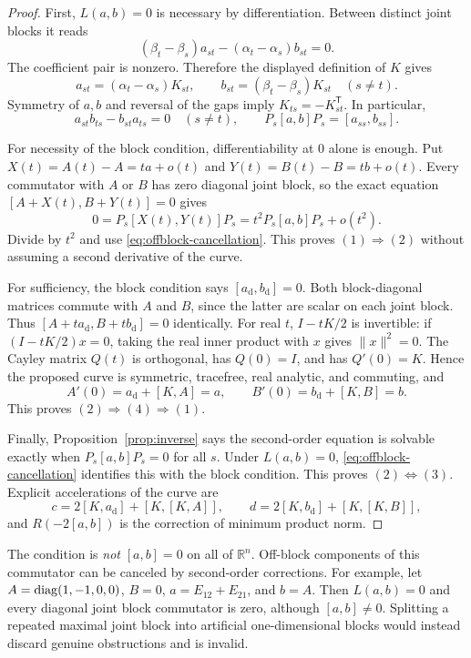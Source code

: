 \begin{proof}
First, $L(a,b)=0$ is necessary by differentiation.  Between distinct joint
blocks it reads
\[
 (\beta_t-\beta_s)a_{st}-(\alpha_t-\alpha_s)b_{st}=0.
\]
The coefficient pair is nonzero.  Therefore the displayed definition of
$K$ gives
\[
 a_{st}=(\alpha_t-\alpha_s)K_{st},\qquad
 b_{st}=(\beta_t-\beta_s)K_{st}\quad(s\ne t).
\]
Symmetry of $a,b$ and reversal of the gaps imply $K_{ts}=-K_{st}^{\mathsf T}$.
In particular,
\begin{equation}\label{eq:offblock-cancellation}
 a_{st}b_{ts}-b_{st}a_{ts}=0\quad(s\ne t),\qquad
 P_s[a,b]P_s=[a_{ss},b_{ss}].
\end{equation}

For necessity of the block condition, differentiability at $0$ alone is
enough.  Put $X(t)=A(t)-A=ta+o(t)$ and $Y(t)=B(t)-B=tb+o(t)$.  Every
commutator with $A$ or $B$ has zero diagonal joint block, so the exact
equation $[A+X(t),B+Y(t)]=0$ gives
\[
 0=P_s[X(t),Y(t)]P_s=t^2P_s[a,b]P_s+o(t^2).
\]
Divide by $t^2$ and use \eqref{eq:offblock-cancellation}.  This proves
$(1)\Rightarrow(2)$ without assuming a second derivative of the curve.

For sufficiency, the block condition says $[a_{\mathrm d},b_{\mathrm d}]=0$.
Both block-diagonal matrices commute with $A$ and $B$, since the latter
are scalar on each joint block.  Thus
$[A+t a_{\mathrm d},B+t b_{\mathrm d}]=0$ identically.  For real $t$,
$I-tK/2$ is invertible: if $(I-tK/2)x=0$, taking the real inner product with
$x$ gives $\|x\|^2=0$.  The Cayley matrix $Q(t)$ is orthogonal, has
$Q(0)=I$, and has $Q'(0)=K$.  Hence the proposed curve is symmetric,
tracefree, real analytic, and commuting, and
\[
 A'(0)=a_{\mathrm d}+[K,A]=a,\qquad
 B'(0)=b_{\mathrm d}+[K,B]=b.
\]
This proves $(2)\Rightarrow(4)\Rightarrow(1)$.

Finally, Proposition~\ref{prop:inverse} says the second-order equation is
solvable exactly when $P_s[a,b]P_s=0$ for all $s$.  Under $L(a,b)=0$,
\eqref{eq:offblock-cancellation} identifies this with the block condition.
This proves $(2)\Leftrightarrow(3)$.  Explicit accelerations of the curve are
\[
 c=2[K,a_{\mathrm d}]+[K,[K,A]],\qquad
 d=2[K,b_{\mathrm d}]+[K,[K,B]],
\]
and $R(-2[a,b])$ is the correction of minimum product norm.
\end{proof}

\begin{remark}
The condition is \emph{not} $[a,b]=0$ on all of $\mathbb R^n$.  Off-block
components of this commutator can be canceled by second-order corrections.
For example, let $A=\operatorname{diag}(1,-1,0,0)$, $B=0$,
$a=E_{12}+E_{21}$, and $b=A$.  Then $L(a,b)=0$ and every diagonal joint
block commutator is zero, although $[a,b]\ne0$.  Splitting a repeated
maximal joint block into artificial one-dimensional blocks would instead
discard genuine obstructions and is invalid.
\end{remark}

